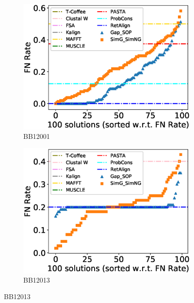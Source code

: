 \begin{figure}[!htbp]
	\centering
	\begin{adjustwidth}{-1.5cm}{-1cm}
		\begin{subfigure}{0.22\textwidth}
			\includegraphics[width=\columnwidth]{Figure/summary/precomputedInit/Balibase/BB12001_fnrate_density_single_run}
			\caption{BB12001}
		\end{subfigure}	
		\begin{subfigure}{0.22\textwidth}
			\includegraphics[width=\columnwidth]{Figure/summary/precomputedInit/Balibase/BB12013_fnrate_density_single_run}
			\caption{BB12013}
		\end{subfigure}

\end{adjustwidth}
\end{figure}

